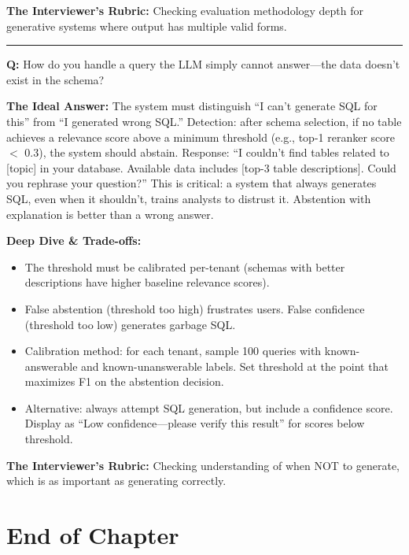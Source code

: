 \textbf{The Interviewer's Rubric:} Checking evaluation methodology depth for generative systems where output has multiple valid forms.

\bigskip\hrule\bigskip

\textbf{Q:} How do you handle a query the LLM simply cannot answer---the data doesn't exist in the schema?

\textbf{The Ideal Answer:} The system must distinguish ``I can't generate SQL for this'' from ``I generated wrong SQL.'' Detection: after schema selection, if no table achieves a relevance score above a minimum threshold (e.g., top-1 reranker score $<$ 0.3), the system should abstain. Response: ``I couldn't find tables related to [topic] in your database. Available data includes [top-3 table descriptions]. Could you rephrase your question?'' This is critical: a system that always generates SQL, even when it shouldn't, trains analysts to distrust it. Abstention with explanation is better than a wrong answer.

\textbf{Deep Dive \& Trade-offs:}
\begin{itemize}
  \item The threshold must be calibrated per-tenant (schemas with better descriptions have higher baseline relevance scores).
  \item False abstention (threshold too high) frustrates users. False confidence (threshold too low) generates garbage SQL.
  \item Calibration method: for each tenant, sample 100 queries with known-answerable and known-unanswerable labels. Set threshold at the point that maximizes F1 on the abstention decision.
  \item Alternative: always attempt SQL generation, but include a confidence score. Display as ``Low confidence---please verify this result'' for scores below threshold.
\end{itemize}

\textbf{The Interviewer's Rubric:} Checking understanding of when NOT to generate, which is as important as generating correctly.

\section*{End of Chapter}

